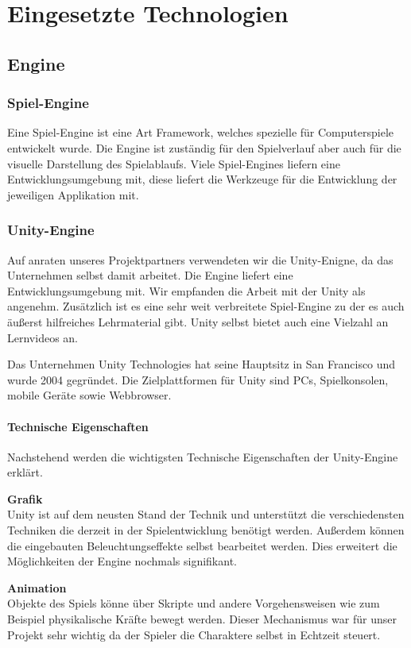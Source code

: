\chapter{Eingesetzte Technologien}
\section{Engine}

\subsection{Spiel-Engine}
Eine Spiel-Engine ist eine Art Framework, welches spezielle für Computerspiele entwickelt wurde. Die Engine ist zuständig für den Spielverlauf aber auch für die visuelle Darstellung des Spielablaufs. Viele Spiel-Engines liefern eine Entwicklungsumgebung mit, diese liefert die Werkzeuge für die Entwicklung der jeweiligen Applikation mit. \cite{Spiel-Engine}

\subsection{Unity-Engine}
Auf anraten unseres Projektpartners verwendeten wir die Unity-Enigne, da das Unternehmen selbst damit arbeitet. Die Engine liefert eine Entwicklungsumgebung mit. Wir empfanden die Arbeit mit der Unity als angenehm. Zusätzlich ist es eine sehr weit verbreitete Spiel-Engine zu der es auch äußerst hilfreiches Lehrmaterial gibt. Unity selbst bietet auch eine Vielzahl an Lernvideos an.

Das Unternehmen Unity Technologies hat seine Hauptsitz in San Francisco und wurde 2004 gegründet. Die Zielplattformen für Unity sind PCs, Spielkonsolen, mobile Geräte sowie Webbrowser. \cite{Unity-Engine}

\subsubsection{Technische Eigenschaften}
Nachstehend werden die wichtigsten Technische Eigenschaften der Unity-Engine erklärt. 

\textbf{Grafik}\\
Unity ist auf dem neusten Stand der Technik und unterstützt die verschiedensten Techniken die derzeit in der Spielentwicklung benötigt werden. Außerdem können die eingebauten Beleuchtungseffekte selbst bearbeitet werden. Dies erweitert die Möglichkeiten der Engine nochmals signifikant.

\textbf{Animation}\\
Objekte des Spiels könne über Skripte und andere Vorgehensweisen wie zum Beispiel physikalische Kräfte bewegt werden. Dieser Mechanismus war für unser Projekt sehr wichtig da der Spieler die Charaktere selbst in Echtzeit steuert. 

